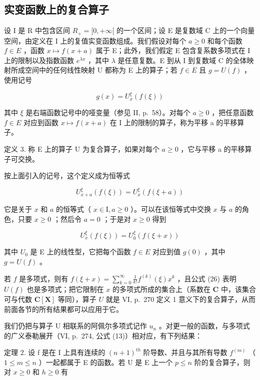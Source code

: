 \subsection{实变函数上的复合算子}

设 I 是 R 中包含区间 \(R_{+} = [0, +\infty[\) 的一个区间；设 E 是复数域 C 上的一个向量空间，由定义在 I 上的复值实变函数组成。我们假设对每个 \(a \geqslant 0\) 和每个函数 \(f \in E\) ，函数 \(x \mapsto f(x + a)\) 属于 E；此外，我们假定 E 包含复系数多项式在 I 上的限制以及指数函数 \(e^{\lambda x}\) ，其中 \(\lambda\) 是任意复数。E 到从 I 到复数域 C 的全体映射所成空间中的任何线性映射 U 都称为 E 上的算子；若 \(f \in E\) 且 \(g = U(f)\) ，使用记号

\[
g (x) = U _ {x} ^ {\xi} \left(f (\xi)\right)
\]

其中 \(\xi\) 是右端函数记号中的哑变量（参见 II, p.~58）。对每个 \(a \geqslant 0\) ，把任意函数 \(f \in E\) 对应到函数 \(x \mapsto f(x + a)\) 在 I 上的限制的算子，称为平移 a 的平移算子。

定义 3. 称 E 上的算子 U 为复合算子，如果对每个 \(a \geqslant 0\) ，它与平移 a 的平移算子可交换。

按上面引入的记号，这个定义成为恒等式

\[
U _ {x + a} ^ {\xi} (f (\xi)) = U _ {x} ^ {\xi} (f (\xi + a))\tag{25}
\]

它是关于 \(x\) 和 \(a\) 的恒等式（ \(x \in \mathrm{I}, a \geqslant 0\) ）。可以在该恒等式中交换 \(x\) 与 \(a\) 的角色，只要 \(x \geqslant 0\) ；然后令 \(a = 0\) ；于是对 \(x \geqslant 0\) 得到

\[
U _ {x} ^ {\xi} (f (\xi)) = U _ {0} ^ {\xi} (f (\xi + x))\tag{26}
\]

其中 \(U_{0}\) 是 E 上的线性型，它把每个函数 \(f \in E\) 对应到值 \(g(0)\) ，其中 \(g = U(f)\) 。

若 \(f\) 是多项式，则有 \(f(\xi + x) = \sum_{k=0}^{\infty} \frac{1}{k!} f^{(k)}(\xi)x^k\) ，且公式 (26) 表明 \(U(f)\) 也是多项式；把它限制在 \(x\) 的多项式所成的集合上（系数在 \(\mathbf{C}\) 中，该集合可与代数 \(\mathbf{C}[\mathbf{X}]\) 等同），算子 \(U\) 就是 VI, p.~270 定义 1 意义下的复合算子，从而前面各节的所有结果都可以应用于它。

我们仍把与算子 U 相联系的阿佩尔多项式记作 \(u_{n}\) 。对更一般的函数，与多项式的广义泰勒展开（VI, p.~274, 公式 (13)）相对应，有下列结果：

定理 2. 设 f 是在 I 上具有连续的 \((n+1)^{th}\) 阶导数、并且与其所有导数 \(f^{(m)}\) （ \(1 \leqslant m \leqslant n\) ）一起都属于 E 的函数。若 U 是 E 上一个 \(p \leqslant n\) 阶的复合算子，则对 \(x \geqslant 0\) 和 \(h \geqslant 0\) 有

